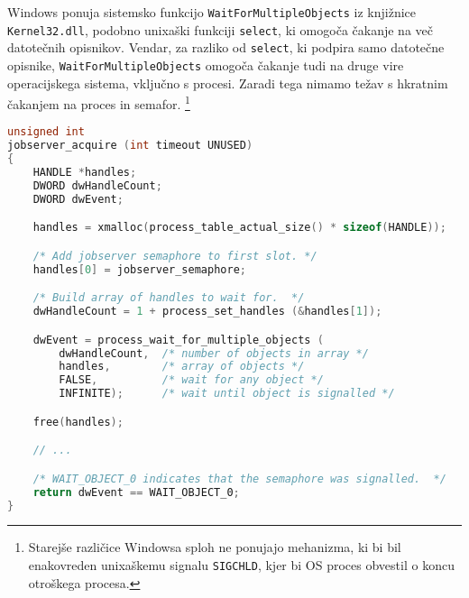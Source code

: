 \documentclass[notitlepage]{report}
\begin{document}
Windows ponuja sistemsko funkcijo \verb|WaitForMultipleObjects| iz
knjižnice \verb|Kernel32.dll|, podobno unixaški funkciji
\verb|select|, ki omogoča čakanje na več datotečnih opisnikov. Vendar,
za razliko od \verb|select|, ki podpira samo datotečne opisnike,
\verb|WaitForMultipleObjects| omogoča čakanje tudi na druge vire
operacijskega sistema, vključno s procesi. Zaradi tega nimamo težav s
hkratnim čakanjem na proces in semafor. \footnote{Starejše različice
  Windowsa sploh ne ponujajo mehanizma, ki bi bil enakovreden
  unixaškemu signalu \verb|SIGCHLD|, kjer bi OS proces obvestil o
  koncu otroškega procesa.}

\begin{lstlisting}[language=C, basicstyle=\sffamily]
unsigned int
jobserver_acquire (int timeout UNUSED)
{
    HANDLE *handles;
    DWORD dwHandleCount;
    DWORD dwEvent;

    handles = xmalloc(process_table_actual_size() * sizeof(HANDLE));

    /* Add jobserver semaphore to first slot. */
    handles[0] = jobserver_semaphore;

    /* Build array of handles to wait for.  */
    dwHandleCount = 1 + process_set_handles (&handles[1]);

    dwEvent = process_wait_for_multiple_objects (
        dwHandleCount,  /* number of objects in array */
        handles,        /* array of objects */
        FALSE,          /* wait for any object */
        INFINITE);      /* wait until object is signalled */

    free(handles);

    // ...

    /* WAIT_OBJECT_0 indicates that the semaphore was signalled.  */
    return dwEvent == WAIT_OBJECT_0;
}
\end{lstlisting}


\end{document}
